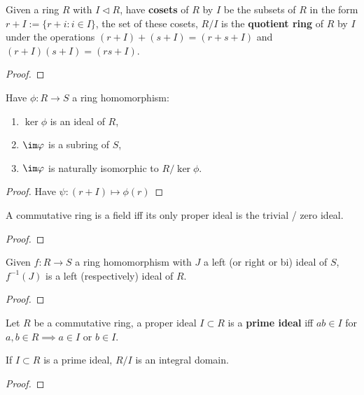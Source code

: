 \documentclass[../Year2.tex]{subfiles}
\begin{document}
\begin{definition}
    Given a ring $R$ with $I\lhd R$, have \textbf{cosets} of $R$ by $I$ be the subsets of $R$ in the form $r+I:=\{r+i:i\in I\}$, the set of these cosets, $R/I$ is the \textbf{quotient ring} of $R$ by $I$ under the operations $(r+I)+(s+I)=(r+s+I)$ and $(r+I)(s+I)=(rs+I)$.\begin{proof}
        
    \end{proof}
\end{definition}

\begin{theorem}
    Have $\phi:R\rightarrow S$ a ring homomorphism:\begin{enumerate}
        \item $\ker\phi$ is an ideal of $R$,
        \item $\im\phi$ is a subring of $S$,
        \item $\im\phi$ is naturally isomorphic to $R/\ker\phi$.
    \end{enumerate}
    \begin{proof}
        Have $\psi:(r+I)\mapsto\phi(r)$
    \end{proof}
\end{theorem}

\begin{proposition}
    A commutative ring is a field iff its only proper ideal is the trivial / zero ideal.
    \begin{proof}
        
    \end{proof}
\end{proposition}

\begin{proposition}
    Given $f:R\rightarrow S$ a ring homomorphism with $J$ a left (or right or bi) ideal of $S$, $f^{-1}(J)$ is a left (respectively) ideal of $R$.
    \begin{proof}
        
    \end{proof}
\end{proposition}

\begin{definition}
    Let $R$ be a commutative ring, a proper ideal $I\subset R$ is a \textbf{prime ideal} iff $ab\in I$ for $a,b\in R \implies a\in I$ or $b\in I$.
\end{definition}

\begin{theorem}
    If $I\subset R$ is a prime ideal, $R/I$ is an integral domain.
    \begin{proof}
        
    \end{proof}
\end{theorem}
\end{document}
